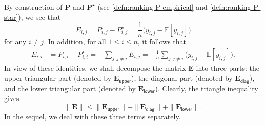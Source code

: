 %



By construction of $\bm{P}$ and $\bm{P}^{\star}$ (see \eqref{defn:ranking-P-empirical} and \eqref{defn:ranking-P-star}), we see that
%
\begin{equation}
	E_{i,j}=P_{i,j}-P_{i,j}^{\star}=\frac{1}{n} \big( y_{i,j}- \mathbb{E} [ y_{i,j}] \big) \label{eq:ranking-noise-off-diag}
\end{equation}
%
for any $i\neq j$.
In addition, for all $1\leq i\leq n$, it follows that
%
\begin{align}
E_{i,i} & =P_{i,i}-P_{i,i}^{\star}
= -\sum_{j:j\neq i}E_{i,j}
  =-\frac{1}{n}\sum_{j:j\neq i}\big( y_{i,j}- \mathbb{E} [ y_{i,j}] \big) .\label{eq:ranking-noise-diag}
\end{align}
%
In view of these identities, we shall decompose the matrix $\bm{E}$
into three parts: the upper triangular part (denoted by $\bm{E}_{\mathsf{upper}}$),
the diagonal part (denoted by $\bm{E}_{\mathsf{diag}}$), and the lower triangular
part (denoted by $\bm{E}_{\mathsf{lower}}$). Clearly,  the triangle inequality gives
%
\begin{equation}
\|\bm{E}\|\leq\|\bm{E}_{\mathsf{upper}}\|+\|\bm{E}_{\mathsf{diag}}\|+\|\bm{E}_{\mathsf{lower}}\|.\label{eq:ranking-triangle}
\end{equation}
%
In the sequel, we deal with these three terms separately.

